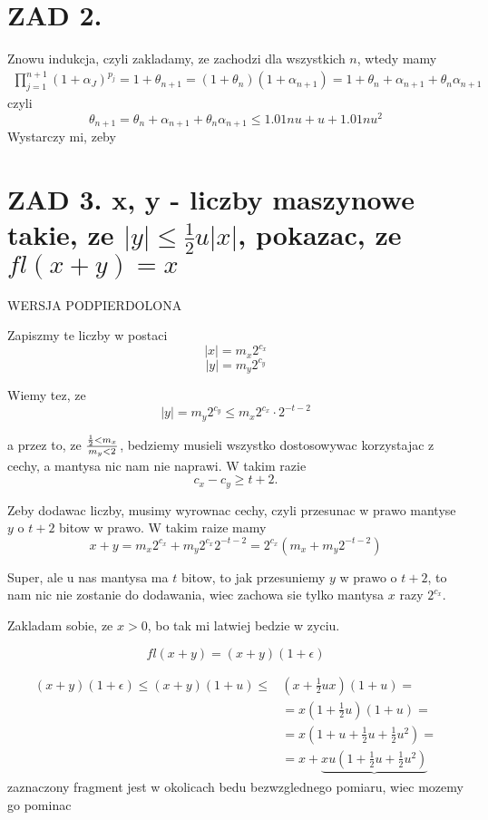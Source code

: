 \documentclass{article}[13pt]
\begin{document}
    \section*{ZAD 2.}

    Znowu indukcja, czyli zakladamy, ze zachodzi dla wszystkich $n$, wtedy mamy
    \begin{align*}
        \prod\limits_{j=1}^{n+1}(1+\alpha_J)^{p_j}=1+\theta_{n+1}=(1+\theta_n)(1+\alpha_{n+1})=1+\theta_n+\alpha_{n+1}+\theta_n\alpha_{n+1}
    \end{align*}
    czyli
    $$\theta_{n+1}=\theta_n+\alpha_{n+1}+\theta_n\alpha_{n+1}\leq1.01nu+u+1.01nu^2$$
    Wystarczy mi, zeby



    \section*{ZAD 3. x, y - liczby maszynowe takie, ze $|y|\leq \frac12 u|x|$, pokazac, ze $fl(x+y)=x$}

    WERSJA PODPIERDOLONA
    \medskip

    Zapiszmy te liczby w postaci
    $$|x|=m_x2^{c_x}$$
    $$|y|=m_y2^{c_y}$$

    Wiemy tez, ze
    $$|y|=m_y2^{c_y}\leq m_x2^{c_x}\cdot 2^{-t-2}$$

    a przez to, ze $\frac12<{m_x}\over m_y<2$, bedziemy musieli wszystko dostosowywac korzystajac z cechy, a mantysa nic nam nie naprawi. W takim razie
    $$c_x-c_y\geq t+2.$$
    
    Zeby dodawac liczby, musimy wyrownac cechy, czyli przesunac w prawo mantyse $y$ o $t+2$ bitow w prawo. W takim raize mamy
    $$x+y=m_x2^{c_x}+m_y2^{c_x}2^{-t-2}=2^{c_x}(m_x+m_y2^{-t-2})$$

    Super, ale u nas mantysa ma $t$ bitow, to jak przesuniemy $y$ w prawo o $t+2$, to nam nic nie zostanie do dodawania, wiec zachowa sie tylko mantysa $x$ razy $2^{c_x}$.

    \bigskip

    \bigskip

    Zakladam sobie, ze $x>0$, bo tak mi latwiej bedzie w zyciu.

    $$fl(x+y)=(x+y)(1+\epsilon)$$

    \begin{align*}
        (x+y)(1+\epsilon)\leq (x+y)(1+u)\leq &(x+\frac12ux)(1+u)=\\
        &=x(1+\frac12u)(1+u)=\\
        &=x(1+u+\frac12u+\frac12 u^2)=\\
        &=x+\underbrace{xu(1+\frac12u+\frac12u^2)}
    \end{align*}
    zaznaczony fragment jest w okolicach bedu bezwzglednego pomiaru, wiec mozemy go pominac
\end{document}
